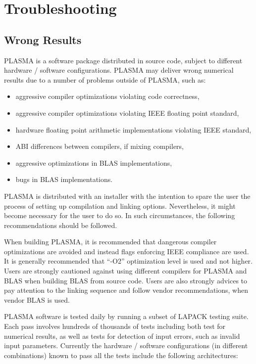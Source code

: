 
\chapter{Troubleshooting}
\label{sec:trouble}

\section{Wrong Results}

PLASMA is a software package distributed in source code, subject to different hardware / software
configurations.
PLASMA may deliver wrong numerical results due to a number of problems outside of PLASMA, such as:
\begin{itemize}
\item aggressive compiler optimizations violating code correctness,
\item aggressive compiler optimizations violating IEEE floating point standard,
\item hardware floating point arithmetic implementations violating IEEE standard,
\item ABI differences between compilers, if mixing compilers,
\item aggressive optimizations in BLAS implementations,
\item bugs in BLAS implementations.
\end{itemize}

PLASMA is distributed with an installer with the intention to spare the user the process
of setting up compilation and linking options.
Nevertheless, it might become necessary for the user to do so.
In such circumstances, the following recommendations should be followed.

When building PLASMA, it is recommended that dangerous compiler optimizations are avoided and
instead flags enforcing IEEE compliance are used.
It is generally recommended that ``-O2'' optimization level is used and not higher.
Users are strongly cautioned against using different compilers for PLASMA and BLAS
when building BLAS from source code.
Users are also strongly advices to pay attention to the linking sequence and follow
vendor recommendations, when vendor BLAS is used.

PLASMA software is tested daily by running a subset of LAPACK testing suite.
Each pass involves hundreds of thousands of tests including both test for numerical results,
as well as tests for detection of input errors, such as invalid input parameters.
Currently the hardware / software configurations (in different combinations) known to pass
all the tests include the following architectures:

